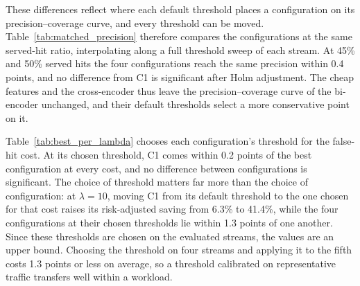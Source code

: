 \documentclass[authoryear,preprint,review,12pt]{elsarticle}
\begin{document}
These differences reflect where each default threshold places a configuration on its precision--coverage curve, and every threshold can be moved. Table~\ref{tab:matched_precision} therefore compares the configurations at the same served-hit ratio, interpolating along a full threshold sweep of each stream. At 45\% and 50\% served hits the four configurations reach the same precision within 0.4 points, and no difference from C1 is significant after Holm adjustment. The cheap features and the cross-encoder thus leave the precision--coverage curve of the bi-encoder unchanged, and their default thresholds select a more conservative point on it.

\begin{table}[htbp]
\centering
\caption{Hit precision at matched served-hit ratio, mean $\pm$ standard deviation over the five evaluation streams, interpolated along each stream's full threshold sweep. No difference from C1 is significant (smallest Holm-adjusted $p=0.20$).}
\label{tab:matched_precision}
\end{table}

Table~\ref{tab:best_per_lambda} chooses each configuration's threshold for the false-hit cost. At its chosen threshold, C1 comes within 0.2 points of the best configuration at every cost, and no difference between configurations is significant. The choice of threshold matters far more than the choice of configuration: at $\lambda=10$, moving C1 from its default threshold to the one chosen for that cost raises its risk-adjusted saving from 6.3\% to 41.4\%, while the four configurations at their chosen thresholds lie within 1.3 points of one another. Since these thresholds are chosen on the evaluated streams, the values are an upper bound. Choosing the threshold on four streams and applying it to the fifth costs 1.3 points or less on average, so a threshold calibrated on representative traffic transfers well within a workload.
\end{document}

